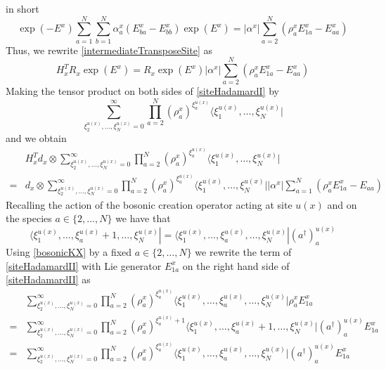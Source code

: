 \documentclass[11pt]{article}
\numberwithin{equation}{section}
\numberwithin{equation}{subsection}
\begin{document}
in short
\begin{equation}\label{HadTransfBoundary}
\exp{(-E^{x})}\sum_{a=1}^{N}\sum_{b=1}^{N}\alpha_{a}^{x}\left(E_{b a}^{x}-E_{bb}^{x}\right)\exp{(E^{x})}=	|\alpha^{x}|\sum_{a=2}^{N}\left(\rho_{a}^{x}E_{1a}^{x}-E_{aa}^{x}\right)
\end{equation}
Thus, we rewrite \eqref{intermediateTransposeSite} as
\begin{equation}\label{siteHadamardI}
H_{x}^{T}R_{x}\exp{(E^{x})}=R_{x}\exp{(E^{x})}|\alpha^{x}|\sum_{a=2}^{N}\left(\rho_{a}^{x}E_{1a}^{x}-E_{aa}^{x}\right)
\end{equation}
Making the tensor product on both sides of \eqref{siteHadamardI} by 
\begin{equation}
\sum_{\xi_{2}^{u(x)},\ldots,\xi_{N}^{u(x)}=0}^{\infty}\prod_{a=2}^{N}\left(\rho_{a}^{x}\right)^{\xi_{a}^{u(x)}}\langle \xi_{1}^{u(x)},\ldots,\xi_{N}^{u(x)}|
\end{equation}
and we obtain 
\begin{equation}\label{siteHadamardII}
    \begin{split}
&H_{x}^{T}d_{x}\otimes\sum_{\xi_{2}^{u(x)},\ldots,\xi_{N}^{u(x)}=0}^{\infty}\prod_{a=2}^{N}\left(\rho_{a}^{x}\right)^{\xi_{a}^{u(x)}}\langle \xi_{1}^{u(x)},\ldots,\xi_{N}^{u(x)}|
\\=&
d_{x}\otimes \sum_{\xi_{2}^{u(x)},\ldots,\xi_{N}^{u(x)}=0}^{\infty}\prod_{a=2}^{N}\left(\rho_{a}^{x}\right)^{\xi_{a}^{u(x)}}\langle \xi_{1}^{u(x)},\ldots,\xi_{N}^{u(x)}||\alpha^{x}|\sum_{a=1}^{N}\left(\rho_{a}^{x}E_{1a}^{x}-E_{aa}\right)
    \end{split}
\end{equation}
Recalling the action of the bosonic creation operator acting at site $u(x)$ and on the species $a\in \{2,\ldots,N\}$ we have that 
\begin{equation}\label{bosonicKX}
    \langle \xi_{1}^{u(x)},\ldots,\xi_{a}^{u(x)}+1,\ldots,\xi_{N}^{u(x)}|=  \langle \xi_{1}^{u(x)},\ldots,\xi_{a}^{u(x)},\ldots,\xi_{N}^{u(x)}|(a^{\dagger})^{u(x)}_{a}
\end{equation}
Using \eqref{bosonicKX} by a fixed $a\in \{2,\ldots,N\}$ we rewrite the term of \eqref{siteHadamardII} with Lie generator $E_{1a}^{x}$ on the right hand side of \eqref{siteHadamardII} as 
\begin{equation}
    \begin{split}
&\sum_{\xi_{2}^{u(x)},\ldots,\xi_{N}^{u(x)}=0}^{\infty}\prod_{a=2}^{N}\left(\rho_{a}^{x}\right)^{\xi_{a}^{u(x)}}\langle \xi_{1}^{u(x)},\ldots,\xi_{a}^{u(x)},\ldots,\xi_{N}^{u(x)}|\rho_{a}^{x}E_{1a}^{x}
\\=&
\sum_{\xi_{2}^{u(x)},\ldots,\xi_{N}^{u(x)}=0}^{\infty}\prod_{a=2}^{N}\left(\rho_{a}^{x}\right)^{\xi_{a}^{u(x)}+1}\langle \xi_{1}^{u(x)},\ldots,\xi_{a}^{u(x)}+1,\ldots,\xi_{N}^{u(x)}|(a^{\dagger})_{a}^{u(x)}E_{1a}^{x}
\\=&
\sum_{\xi_{2}^{u(x)},\ldots,\xi_{N}^{u(x)}=0}^{\infty}\prod_{a=2}^{N}\left(\rho_{a}^{x}\right)^{\xi_{a}^{u(x)}}\langle \xi_{1}^{u(x)},\ldots,\xi_{a}^{u(x)},\ldots,\xi_{N}^{u(x)}|(a^{\dagger})_{a}^{u(x)}E_{1a}^{x}
    \end{split}
\end{equation}
\end{document}
